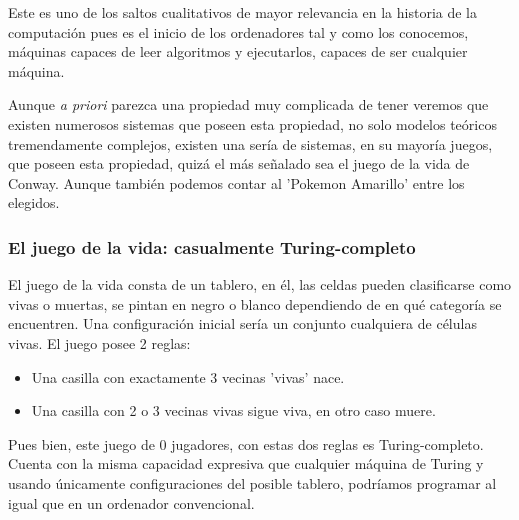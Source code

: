 Este es uno de los saltos cualitativos de mayor relevancia en la historia de la computación pues es el inicio de los ordenadores tal y como los conocemos, máquinas capaces de leer algoritmos y ejecutarlos, capaces de ser cualquier máquina.

\vspace{10px}

Aunque \textit{a priori} parezca una propiedad muy complicada de tener veremos que existen numerosos sistemas que poseen esta propiedad, no solo modelos teóricos tremendamente complejos, existen una sería de sistemas, en su mayoría juegos, que poseen esta propiedad, quizá el más señalado sea el juego de la vida de Conway. Aunque también podemos contar al 'Pokemon Amarillo' entre los elegidos.




\subsubsection{El juego de la vida: casualmente Turing-completo}

El juego de la vida consta de un tablero, en él, las celdas pueden clasificarse como vivas o muertas, se pintan en negro o blanco dependiendo de en qué categoría se encuentren. Una configuración inicial sería un conjunto cualquiera de células vivas. El juego posee 2 reglas:

\begin{multicols}{2}
	\begin{itemize}
		\item Una casilla con exactamente 3 vecinas 'vivas' nace.
		\item Una casilla con 2 o 3 vecinas vivas sigue viva, en otro caso muere.
	\end{itemize}
\end{multicols}


Pues bien, este juego de 0 jugadores, con estas dos reglas es Turing-completo. Cuenta con la misma capacidad expresiva que cualquier máquina de Turing y usando únicamente configuraciones del posible tablero, podríamos programar al igual que en un ordenador convencional.
